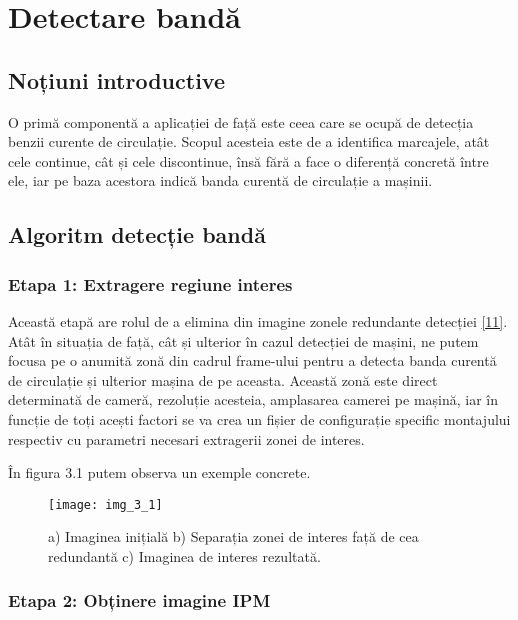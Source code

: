 \section{Detectare bandă}
\subsection*{Noțiuni introductive}
O primă componentă a aplicației de față este ceea care se ocupă de detecția benzii curente de circulație. Scopul acesteia este de a identifica marcajele, atât cele continue, cât și cele discontinue, însă fără a face o diferență concretă între ele, iar pe baza acestora indică banda curentă de circulație a mașinii.

\subsection*{Algoritm detecție bandă}
\subsubsection*{Etapa 1: Extragere regiune interes}

Această etapă are rolul de a elimina din imagine zonele redundante detecției \hyperlink{WaymoSystem}{[11]}. Atât în situația de față, cât și ulterior în cazul detecției de mașini, ne putem focusa pe o anumită zonă din cadrul frame-ului pentru a detecta banda curentă de circulație și ulterior mașina de pe aceasta. 
Această zonă este direct determinată de cameră, rezoluție acesteia, amplasarea camerei pe mașină, iar în funcție de toți acești factori se va crea un fișier de configurație specific montajului respectiv cu parametri necesari extragerii zonei de interes.

În figura 3.1 putem observa un exemple concrete.
\begin{figure}[!h]
	\centering
	\texttt{[image: img\_3\_1]}
	\caption[Zonă interes imagine]{a) Imaginea inițială b) Separația zonei de interes față de cea redundantă c) Imaginea de interes rezultată.}
\end{figure}

\subsubsection*{Etapa 2: Obținere imagine IPM}

